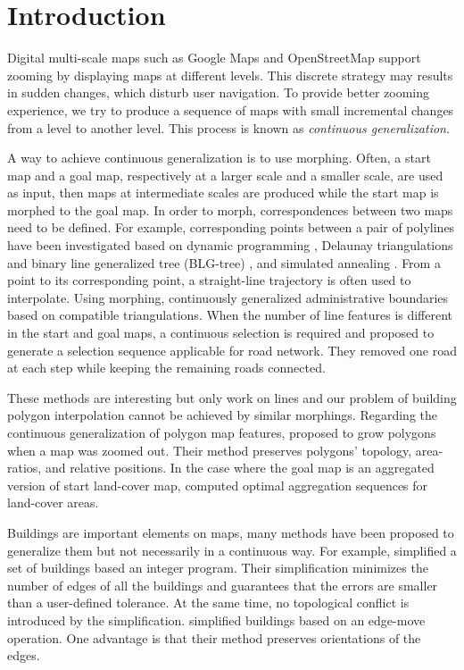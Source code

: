 \section{Introduction}
\label{sec:Introduction}


Digital multi-scale maps such as Google Maps and OpenStreetMap 
support zooming by displaying maps at different levels. 
This discrete strategy may results in sudden changes, which disturb user 
navigation.
To provide better zooming experience, 
we try to produce a sequence of maps 
with small incremental changes from a level to another level.
This process is known as \emph{continuous generalization}.

A way to achieve continuous generalization is to use morphing.
Often, a start map and a goal map, 
respectively at a larger scale and a smaller scale, 
are used as input, 
then maps at intermediate scales are produced 
while the start map is morphed to the goal map.
In order to morph, correspondences between two maps need to be defined.
For example, corresponding points between a pair of polylines have been 
investigated based on 
dynamic programming \citep{mnwb-mpstc-08}, 
Delaunay triangulations and binary line generalized tree (BLG-tree)  
\citep{Deng2015},
and simulated annealing \citep{Li2017_Annealing}.
From a point to its corresponding point,
a straight-line trajectory is often used to interpolate.
Using morphing, \citet{Peng2016_Admin} continuously generalized 
administrative boundaries based on compatible triangulations. When the number 
of line features is different in the start and goal maps, a continuous 
selection is required and \citet{Chimani2014_Eat} proposed to generate a 
selection sequence applicable for road network.
They removed one road at each step while keeping the remaining roads connected.

These methods are interesting but only work on lines and our problem of 
building polygon interpolation cannot be achieved by similar morphings. 
Regarding the continuous generalization of polygon map features,
\citet{Danciger2009} proposed to grow polygons when a map was zoomed out. Their 
method 
preserves polygons' topology, area-ratios, and relative positions.  In the case 
where the goal map is an aggregated version of start land-cover map, 
\citet{Peng2017_AStar} computed optimal aggregation sequences for land-cover 
areas.

Buildings are important elements on maps, many methods have been proposed to 
generalize them but not necessarily in a continuous way.
For example, \citet{haunertwolff2010} simplified a set of buildings 
based an integer program.
Their simplification minimizes the number of edges of all the buildings 
and guarantees that the errors are smaller than a user-defined tolerance.
At the same time, no topological conflict is introduced by the simplification.
\citet{Buchin2011_Simp} simplified buildings based on an edge-move operation.
One advantage is that their method preserves orientations of the edges.

